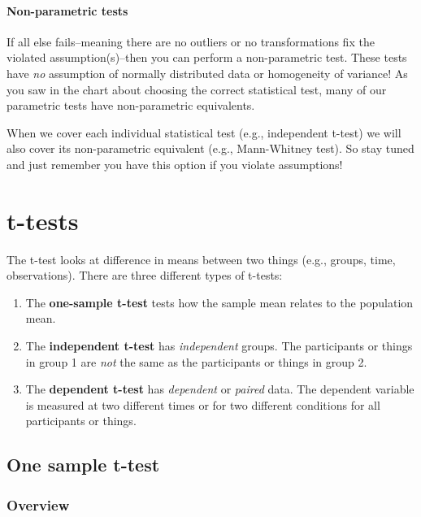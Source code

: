\documentclass[
]{book}
\begin{document}
\hypertarget{non-parametric-tests}{%
\subsubsection{Non-parametric tests}\label{non-parametric-tests}}

If all else fails--meaning there are no outliers or no transformations fix the violated assumption(s)--then you can perform a non-parametric test. These tests have \emph{no} assumption of normally distributed data or homogeneity of variance! As you saw in the chart about choosing the correct statistical test, many of our parametric tests have non-parametric equivalents.

When we cover each individual statistical test (e.g., independent t-test) we will also cover its non-parametric equivalent (e.g., Mann-Whitney test). So stay tuned and just remember you have this option if you violate assumptions!

\hypertarget{t-tests}{%
\chapter{t-tests}\label{t-tests}}

The t-test looks at difference in means between two things (e.g., groups, time, observations). There are three different types of t-tests:

\begin{enumerate}
\def\labelenumi{\arabic{enumi}.}
\item
  The \textbf{one-sample t-test} tests how the sample mean relates to the population mean.
\item
  The \textbf{independent t-test} has \emph{independent} groups. The participants or things in group 1 are \emph{not} the same as the participants or things in group 2.
\item
  The \textbf{dependent t-test} has \emph{dependent} or \emph{paired} data. The dependent variable is measured at two different times or for two different conditions for all participants or things.
\end{enumerate}

\hypertarget{one-sample-t-test}{%
\section{One sample t-test}\label{one-sample-t-test}}

\hypertarget{overview}{%
\subsection{Overview}\label{overview}}
\end{document}
